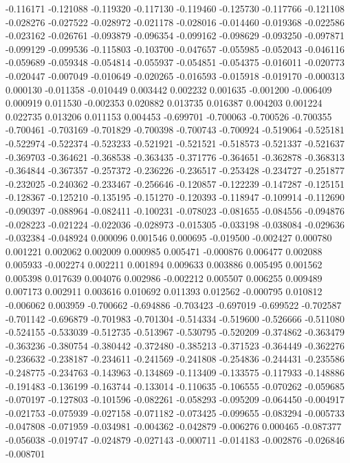 -0.116171
-0.121088
-0.119320
-0.117130
-0.119460
-0.125730
-0.117766
-0.121108
-0.028276
-0.027522
-0.028972
-0.021178
-0.028016
-0.014460
-0.019368
-0.022586
-0.023162
-0.026761
-0.093879
-0.096354
-0.099162
-0.098629
-0.093250
-0.097871
-0.099129
-0.099536
-0.115803
-0.103700
-0.047657
-0.055985
-0.052043
-0.046116
-0.059689
-0.059348
-0.054814
-0.055937
-0.054851
-0.054375
-0.016011
-0.020773
-0.020447
-0.007049
-0.010649
-0.020265
-0.016593
-0.015918
-0.019170
-0.000313
0.000130
-0.011358
-0.010449
0.003442
0.002232
0.001635
-0.001200
-0.006409
0.000919
0.011530
-0.002353
0.020882
0.013735
0.016387
0.004203
0.001224
0.022735
0.013206
0.011153
0.004453
-0.699701
-0.700063
-0.700526
-0.700355
-0.700461
-0.703169
-0.701829
-0.700398
-0.700743
-0.700924
-0.519064
-0.525181
-0.522974
-0.522374
-0.523233
-0.521921
-0.521521
-0.518573
-0.521337
-0.521637
-0.369703
-0.364621
-0.368538
-0.363435
-0.371776
-0.364651
-0.362878
-0.368313
-0.364844
-0.367357
-0.257372
-0.236226
-0.236517
-0.253428
-0.234727
-0.251877
-0.232025
-0.240362
-0.233467
-0.256646
-0.120857
-0.122239
-0.147287
-0.125151
-0.128367
-0.125210
-0.135195
-0.151270
-0.120393
-0.118947
-0.109914
-0.112690
-0.090397
-0.088964
-0.082411
-0.100231
-0.078023
-0.081655
-0.084556
-0.094876
-0.028223
-0.021224
-0.022036
-0.028973
-0.015305
-0.033198
-0.038084
-0.029636
-0.032384
-0.048924
0.000096
0.001546
0.000695
-0.019500
-0.002427
0.000780
0.001221
0.002062
0.002009
0.000985
0.005471
-0.000876
0.006477
0.002088
0.005933
-0.002274
0.002211
0.001894
0.009633
0.003886
0.005495
0.001562
0.005398
0.017639
0.004076
0.002986
-0.002212
0.005507
0.006255
0.009489
0.007173
0.002911
0.003616
0.010692
0.011393
0.012562
-0.000795
0.010812
-0.006062
0.003959
-0.700662
-0.694886
-0.703423
-0.697019
-0.699522
-0.702587
-0.701142
-0.696879
-0.701983
-0.701304
-0.514334
-0.519600
-0.526666
-0.511080
-0.524155
-0.533039
-0.512735
-0.513967
-0.530795
-0.520209
-0.374862
-0.363479
-0.363236
-0.380754
-0.380442
-0.372480
-0.385213
-0.371523
-0.364449
-0.362276
-0.236632
-0.238187
-0.234611
-0.241569
-0.241808
-0.254836
-0.244431
-0.235586
-0.248775
-0.234763
-0.143963
-0.134869
-0.113409
-0.133575
-0.117933
-0.148886
-0.191483
-0.136199
-0.163744
-0.133014
-0.110635
-0.106555
-0.070262
-0.059685
-0.070197
-0.127803
-0.101596
-0.082261
-0.058293
-0.095209
-0.064450
-0.004917
-0.021753
-0.075939
-0.027158
-0.071182
-0.073425
-0.099655
-0.083294
-0.005733
-0.047808
-0.071959
-0.034981
-0.004362
-0.042879
-0.006276
0.000465
-0.087377
-0.056038
-0.019747
-0.024879
-0.027143
-0.000711
-0.014183
-0.002876
-0.026846
-0.008701
